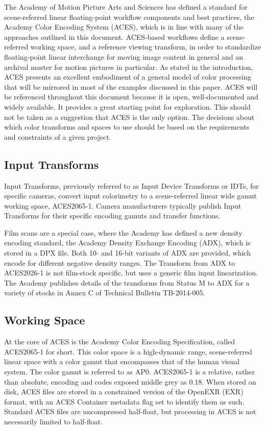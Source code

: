 The Academy of Motion Picture Arts and Sciences has defined a standard for scene-referred linear floating-point workflow components and best practices, the Academy Color Encoding System (ACES), which is in line with many of the approaches outlined in this document. ACES-based workflows define a scene-referred working space, and a reference viewing transform, in order to standardize floating-point linear interchange for moving image content in general and an archival master for motion pictures in particular.
As stated in the introduction, ACES presents an excellent embodiment of a general model of color processing that will be mirrored in most of the examples discussed in this paper. ACES will be referenced throughout this document because it is open, well-documented and widely available. It provides a great starting point for exploration. This should not be taken as a suggestion that ACES is the only option. The decisions about which color transforms and spaces to use should be based on the requirements and constraints of a given project.

\subsection{Input Transforms}

Input Transforms, previously referred to as Input Device Transforms or IDTs, for specific cameras, convert input colorimetry to a scene-referred linear wide gamut working space, ACES2065-1. Camera manufacturers typically publish Input Transforms for their specific encoding gamuts and transfer functions.

Film scans are a special case, where the Academy has defined a new density encoding standard, the Academy Density Exchange Encoding (ADX), which is stored in a DPX file. Both 10- and 16-bit variants of ADX are provided, which encode for different negative density ranges. The Transform from ADX to ACES2026-1 is not film-stock specific, but uses a generic film input linearization. The Academy publishes details of the transforms from Status M to ADX for a variety of stocks in Annex C of Technical Bulletin TB-2014-005.

\subsection{Working Space}

At the core of ACES is the Academy Color Encoding Specification, called ACES2065-1 for short. This color space is a high-dynamic range, scene-referred linear space with a color gamut that encompasses that of the human visual system. The color gamut is referred to as AP0. ACES2065-1 is a relative, rather than absolute, encoding and codes exposed middle grey as 0.18. When stored on disk, ACES files are stored in a constrained version of the OpenEXR (EXR) format, with an ACES Container metadata flag set to identify them as such. Standard ACES files are uncompressed half-float, but processing in ACES is not necessarily limited to half-float.

